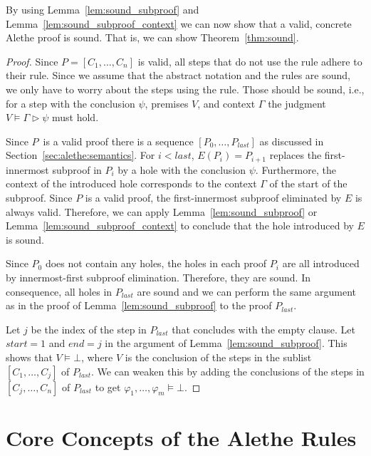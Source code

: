 \documentclass{scrartcl}
\begin{document}
By using Lemma~\ref{lem:sound_subproof} and
Lemma~\ref{lem:sound_subproof_context} we can now show that
a valid, concrete Alethe proof is sound. That is, we can show
Theorem~\ref{thm:sound}.

\begin{proof}
  Since $P =[C_1, \dots, C_n]$ is valid, all steps that do not use the
   rule adhere to their rule.  Since we assume that the
  abstract notation and the rules are sound, we only have to
  worry about the steps using the  rule.
  Those should be sound, i.e., for a  step with the conclusion
  $\psi$, premises $V$, and context $\Gamma$
  the judgment $V \vDash \Gamma \vartriangleright \psi$ must hold.

  Since $P$\, is a valid proof there is a sequence
  $[P_0, \dots, P_{\mathit{last}}]$ as discussed in Section~\ref{sec:alethe:semantics}.
  For $i < \mathit{last}$, $E(P_i) = P_{i+1}$ replaces the
  first-innermost subproof in $P_i$ by a hole with the conclusion
  $\psi$.  Furthermore, the context of the introduced hole
  corresponds to the context $\Gamma$ of the start of the subproof.
  Since $P$ is a valid proof, the first-innermost subproof eliminated by $E$ is
  always valid.
  Therefore,
  we can apply Lemma~\ref{lem:sound_subproof}
  or Lemma~\ref{lem:sound_subproof_context} to conclude that the hole introduced
  by $E$ is sound.

  Since $P_0$ does not contain any holes, the holes in each proof
  $P_i$ are all introduced by innermost-first subproof elimination.
  Therefore, they are sound. In consequence, all holes in $P_{\mathit{last}}$ are
  sound and we can perform the same
  argument as
  in the proof of Lemma~\ref{lem:sound_subproof} to the proof
  $P_{\mathit{last}}$.

  Let $j$ be the index of the step in $P_{\mathit{last}}$ that concludes
  with the empty clause.
  Let $\mathit{start} = 1$
  and $\mathit{end} = j$ in the argument of Lemma~\ref{lem:sound_subproof}.
  This shows that $V \vDash \bot$, where $V$ is the
  conclusion of the  steps in the sublist $[C_1, \dots, C_j]$
  of $P_{\mathit{last}}$.  We can weaken
  this by adding the conclusions of the  steps in
  $[C_j, \dots, C_n]$ of $P_{\mathit{last}}$
  to get $\varphi_1, \dots, \varphi_m \vDash \bot$.
\end{proof}


\section{Core Concepts of the Alethe Rules}
\label{sec:alethe:rules-generic}
\end{document}
